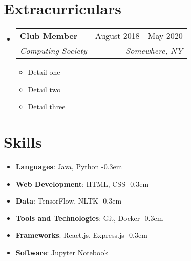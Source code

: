\documentclass[letterpaper, 10pt]{article}
\makeatletter
\newcommand{\resumeItem}[2]{
	\item\small{
		\textbf{#1}{#2 \vspace{-3pt}}
	}
}
\newcommand{\resumeSubheading}[4]{
	\vspace{-1pt}\item[\label{}]
		\begin{tabular*}{0.97\textwidth}[t]{l@{\extracolsep{\fill}}r}
		\textbf{#1} & #2 \\
		\textit{\small#3} & \textit{\small #4} \\
		\end{tabular*}\vspace{-5pt}
}
\newcommand{\resumeSubHeadingListStart}{\begin{itemize}[leftmargin=* \label{}]}
\newcommand{\resumeSubHeadingListEnd}{\end{itemize}}
\newcommand{\resumeItemListStart}{\begin{itemize}\vspace{2pt}}
\newcommand{\resumeItemListEnd}{\end{itemize}\vspace{-5pt}}
\makeatother
\begin{document}
                                 \section{Extracurriculars}
                                     \resumeSubHeadingListStart
								\resumeSubheading
									{Club Member}{August 2018 - May 2020}
									{Computing Society}{Somewhere, NY}
										\resumeItemListStart
											\resumeItem{}{Detail one}
											\resumeItem{}{Detail two}
											\resumeItem{}{Detail three}
										\resumeItemListEnd
							\resumeSubHeadingListEnd

                 \section{Skills}
                     \resumeSubHeadingListStart
                     	\itemsep-0.3em
                         \item[]{
                                 \textbf{Languages}{: Java, Python}
                         }
                         \itemsep-0.3em
                         \item[]{
                        	 	\textbf{Web Development}{: HTML, CSS}
                         }
                         \itemsep-0.3em
                         \item[]{
                             	\textbf{Data}{: TensorFlow, NLTK}
                         }
                         \itemsep-0.3em
                     	\item[]{
				\textbf{Tools and Technologies}{: Git, Docker}
			}
			\itemsep-0.3em
                         \item[]{
                             	\textbf{Frameworks}{: React.js, Express.js}
                         }
                         \itemsep-0.3em
                         \item[]{
                         		\textbf{Software}{: Jupyter Notebook}
                         }
                 	\resumeSubHeadingListEnd
\end{document}
